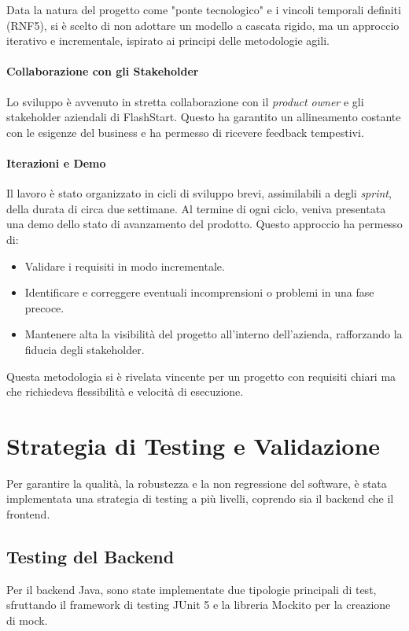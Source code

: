 \documentclass[12pt,a4paper,openright,twoside]{book}
\begin{document}
Data la natura del progetto come "ponte tecnologico" e i vincoli temporali definiti (RNF5), si è scelto di non adottare un modello a cascata rigido, ma un approccio iterativo e incrementale, ispirato ai principi delle metodologie agili.

\paragraph{Collaborazione con gli Stakeholder} Lo sviluppo è avvenuto in stretta collaborazione con il \textit{product owner} e gli stakeholder aziendali di FlashStart. Questo ha garantito un allineamento costante con le esigenze del business e ha permesso di ricevere feedback tempestivi.

\paragraph{Iterazioni e Demo} Il lavoro è stato organizzato in cicli di sviluppo brevi, assimilabili a degli \textit{sprint}, della durata di circa due settimane. Al termine di ogni ciclo, veniva presentata una demo dello stato di avanzamento del prodotto. Questo approccio ha permesso di:
\begin{itemize}
    \item Validare i requisiti in modo incrementale.
    \item Identificare e correggere eventuali incomprensioni o problemi in una fase precoce.
    \item Mantenere alta la visibilità del progetto all'interno dell'azienda, rafforzando la fiducia degli stakeholder.
\end{itemize}
Questa metodologia si è rivelata vincente per un progetto con requisiti chiari ma che richiedeva flessibilità e velocità di esecuzione.

\section{Strategia di Testing e Validazione}
\label{sec:testing}
Per garantire la qualità, la robustezza e la non regressione del software, è stata implementata una strategia di testing a più livelli, coprendo sia il backend che il frontend.

\subsection{Testing del Backend}
Per il backend Java, sono state implementate due tipologie principali di test, sfruttando il framework di testing JUnit 5 e la libreria Mockito per la creazione di mock.
\end{document}
